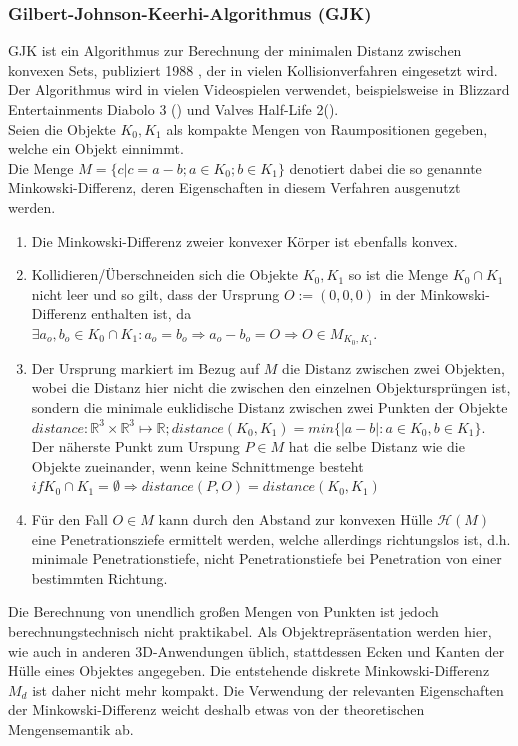 \subsubsection{Gilbert-Johnson-Keerhi-Algorithmus (GJK)}
GJK ist ein Algorithmus zur Berechnung der minimalen Distanz zwischen konvexen Sets, publiziert 1988 \cite{gjk}, der in vielen Kollisionverfahren eingesetzt wird.\\
		Der Algorithmus wird in vielen Videospielen verwendet, beispielsweise in Blizzard Entertainments Diabolo 3 (\cite{gdc-physics}) und Valves Half-Life 2(\cite{gjk-blog}).\\
		
		Seien die Objekte $K_0, K_1$ als kompakte Mengen von Raumpositionen gegeben, welche ein Objekt einnimmt.\\
		Die Menge $M = \{c | c = a - b; a\in K_0 ; b\in K_1\}$ denotiert dabei die so genannte Minkowski-Differenz, deren Eigenschaften in diesem Verfahren ausgenutzt werden.\\
		\begin{enumerate}
			\item Die Minkowski-Differenz zweier konvexer Körper ist ebenfalls konvex.
			\item Kollidieren/Überschneiden sich die Objekte $K_0, K_1$ so ist die Menge $K_0 \cap K_1$ nicht leer und so gilt, dass der Ursprung $O := (0,0,0)$ in der Minkowski-Differenz enthalten ist, da $\exists a_o, b_o \in K_0 \cap K_1 : a_o = b_o \Rightarrow a_o - b_o = O \Rightarrow O \in M_{K_0, K_1}$.
			\item Der Ursprung markiert im Bezug auf $M$ die Distanz zwischen zwei Objekten, wobei die Distanz hier nicht die zwischen den einzelnen Objektursprüngen ist, sondern die minimale euklidische Distanz zwischen zwei Punkten der Objekte $distance: \mathbb{R}^3 \times \mathbb{R}^3 \mapsto \mathbb{R}; distance(K_0, K_1) = min\{|a - b| : a \in K_0 , b\in K_1\}$. Der näherste Punkt zum Urspung $P\in M$ hat die selbe Distanz wie die Objekte zueinander, wenn keine Schnittmenge besteht $if K_0 \cap K_1 = \emptyset \Rightarrow distance(P, O) = distance(K_0, K_1)$
			\item Für den Fall $O \in M$ kann durch den Abstand zur konvexen Hülle $\mathcal{H}(M)$ eine Penetrationsziefe ermittelt werden, welche allerdings richtungslos ist, d.h. minimale Penetrationstiefe, nicht Penetrationstiefe bei Penetration von einer bestimmten Richtung.
		\end{enumerate}
		Die Berechnung von unendlich großen Mengen von Punkten ist jedoch berechnungstechnisch nicht praktikabel. Als Objektrepräsentation werden hier, wie auch in anderen 3D-Anwendungen üblich, stattdessen Ecken und Kanten der Hülle eines Objektes angegeben. Die entstehende diskrete Minkowski-Differenz $M_d$ ist daher nicht mehr kompakt. Die Verwendung der relevanten Eigenschaften der Minkowski-Differenz weicht deshalb etwas von der theoretischen Mengensemantik ab.
